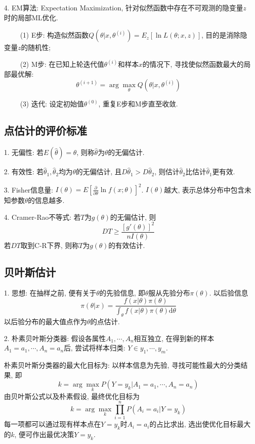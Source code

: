 4. EM算法: Expectation Maximization, 针对似然函数中存在不可观测的隐变量$z$时的局部ML优化.

~~~~ (1) E步: 构造似然函数$Q(\theta | x,\theta^{(i)})=E_z[\ln L(\theta;x,z)]$, 目的是消除隐变量$z$的随机性;

~~~~ (2) M步: 在已知上轮迭代值$\theta^{(i)}$和样本$x$的情况下, 寻找使似然函数最大的局部最优解:
\begin{equation*}
    \theta^{(i+1)}=\arg \max\limits_{\theta} Q(\theta |x, \theta^{(i)})
\end{equation*}

~~~~ (3) 迭代: 设定初始值$\theta^{(0)}$, 重复E步和M步直至收敛.

\subsection{点估计的评价标准}

1. 无偏性: 若$E(\hat{\theta})=\theta$, 则称$\hat{\theta}$为$\theta$的无偏估计.

2. 有效性: 若$\hat{\theta}_1, \hat{\theta}_2$均为$\theta$的无偏估计, 且$D\hat{\theta}_1>D\hat{\theta}_2$, 则估计$\hat{\theta}_2$比估计$\hat{\theta}_1$更有效.

3. Fisher信息量: $I(\theta)=E\left[\frac{\partial}{\partial \theta}\ln f(x;\theta)\right]^2$. $I(\theta)$越大, 表示总体分布中包含未知参数$\theta$的信息越多.

4. Cramer-Rao不等式: 若$T$为$g(\theta)$的无偏估计, 则
\begin{equation*}
    DT \geq \frac{[g'(\theta)]^2}{nI(\theta)}
\end{equation*}
若$DT$取到C-R下界, 则称$T$为$g(\theta)$的有效估计.

\subsection{贝叶斯估计}

1. 思想: 在抽样之前, 便有关于$\theta$的先验信息, 即$\theta$服从先验分布$\pi(\theta)$. 以后验信息
\begin{equation*}
    \pi(\theta|x)=\frac{f(x|\theta)\pi(\theta)}{\int_\theta f(x|\theta)\pi(\theta)\mathrm{d} \theta}
\end{equation*}
以后验分布的最大值点作为$\theta$的点估计.

2. 朴素贝叶斯分类器: 假设各属性$A_1,\cdots,A_n$相互独立, 在得到新的样本$A_1=a_1,\cdots,A_n=a_n$后, 尝试将样本归类: $Y \in {y_1,\cdots,y_m}$.

朴素贝叶斯分类器的最大化目标为: 以样本信息为先验, 寻找可能性最大的分类结果, 即
\begin{equation*}
    k=\arg\max\limits_{k}P(Y=y_k|A_1=a_1,\cdots,A_n=a_n)
\end{equation*}
由贝叶斯公式以及朴素假设, 最终优化目标为
\begin{equation*}
    k=\arg\max\limits_{k} \prod\limits_{i=1}^n P(A_i=a_i|Y=y_k)
\end{equation*}
每一项都可以通过现有样本点在$Y=y_k$时$A_i=a_i$的占比求出, 选出使优化目标最大的$k$, 便可作出最优决策$Y=y_k$.

